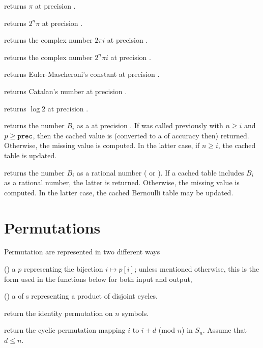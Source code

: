  returns $\pi$ at precision .

 returns $2^n\pi$ at precision .

 returns the complex number $2\pi i$ at
precision .

 returns the complex number $2^n\pi i$ at
precision .

 returns Euler-Mascheroni's constant at
precision .

 returns Catalan's number at precision .

 returns $\log 2$ at precision .

 returns the  number
$B_i$ as a  at precision . If  was called previously with $n \geq i$ and $p \geq {\tt prec}$, then
the cached value is (converted to a  of accuracy  then)
returned. Otherwise, the missing value is computed. In the latter case,
if $n \geq i$, the cached table is updated.

 returns the  number $B_i$ as a
rational number ( or ). If a cached table includes $B_i$
as a rational number, the latter is returned. Otherwise, the missing value is
computed. In the latter case, the cached Bernoulli table may be updated.

\section{Permutations }

\noindent Permutation are represented in two different ways

\item () a  $p$ representing the bijection $i\mapsto
p[i]$; unless mentioned otherwise, this is the form used in the functions
below for both input and output,

\item () a  of s representing a product of
disjoint cycles.

 return the identity permutation on $n$
symbols.

 return the cyclic permutation mapping
$i$ to $i+d$ (mod $n$) in $S_n$. Assume that $d \leq n$.

